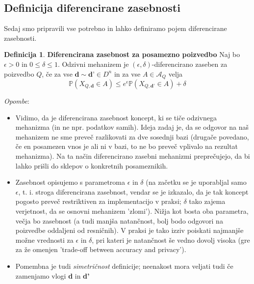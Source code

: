 \documentclass[mat1]{article}
\theoremstyle{definition}
\newtheorem{definition}{Definicija}
\begin{document}
\subsection{Definicija diferencirane zasebnosti}
Sedaj smo pripravili vse potrebno in lahko definiramo pojem diferencirane zasebnosti.
\theoremstyle{definition}
\begin{definition}{\textbf{Diferencirana zasebnost za posamezno poizvedbo}}
Naj bo $\epsilon > 0$ in $0 \leq \delta \leq 1 $. Odzivni mehanizem je $(\epsilon, \delta)$-diferencirano zaseben za poizvedbo $Q$, če za vse $\textbf{d} \sim \textbf{d'} \in D^n$  in za vse $A\in\mathcal{A}_{Q}$ velja 
\begin{equation}\label{diferen}
\mathbb{P}(X_{Q,\textbf{d}} \in A) \leq e^\epsilon \mathbb{P}(X_{Q,\textbf{d'}} \in A) + \delta \tag{4}
\end{equation}
\end{definition}
\textit{Opombe}: 
\begin{itemize}
\item Vidimo, da je diferencirana zasebnost koncept, ki se tiče odzivnega mehanizma (in ne npr. podatkov samih). Ideja zadaj je, da se odgovor na naš mehanizem ne sme preveč razlikovati za dve sosednji bazi (drugače povedano, če en posamezen vnos je ali ni v bazi, to ne bo preveč vplivalo na rezultat mehanizma). Na ta način diferencirano zasebni mehanizmi preprečujejo, da bi lahko prišli do sklepov o konkretnih posameznikih. 
\item Zasebnost opisujemo s parametroma $\epsilon$ in $\delta$ (na začetku se je uporabljal samo $\epsilon$, t. i. stroga diferencirana zasebnost, vendar se je izkazalo, da je tak koncept pogosto preveč restriktiven za implementacijo v praksi; $\delta$ tako zajema verjetnost, da se osnovni mehanizem 'zlomi'). Nižja kot bosta oba parametra, večja bo zasebnost (a tudi manjša natančnost, bolj bodo odgovori na poizvedbe oddaljeni od resničnih). V praksi je tako izziv poiskati najmanjše možne vrednosti za $\epsilon$ in $\delta$, pri kateri je natančnost še vedno dovolj visoka (gre za že omenjen 'trade-off between accuracy and privacy').
\item Pomembna je tudi \textit{simetričnost} definicije; neenakost mora veljati tudi če zamenjamo vlogi \textbf{d} in \textbf{d'}
\end{itemize}
\end{document}

